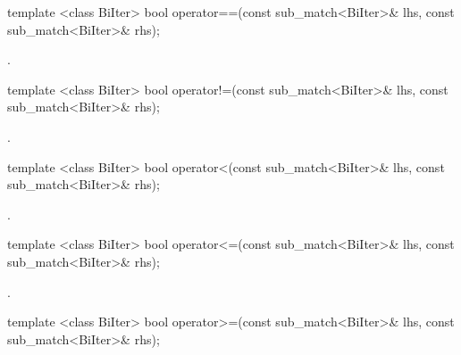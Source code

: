 %
%
\begin{itemdecl}
template <class BiIter>
  bool operator==(const sub_match<BiIter>& lhs, const sub_match<BiIter>& rhs); 
\end{itemdecl}

\begin{itemdescr}
\pnum\returns  {}.
\end{itemdescr}

%
%
\begin{itemdecl}
template <class BiIter>
  bool operator!=(const sub_match<BiIter>& lhs, const sub_match<BiIter>& rhs); 
\end{itemdecl}

\begin{itemdescr}
\pnum\returns {}.
\end{itemdescr}

%
%
\begin{itemdecl}
template <class BiIter>
  bool operator<(const sub_match<BiIter>& lhs, const sub_match<BiIter>& rhs); 
\end{itemdecl}

\begin{itemdescr}
\pnum\returns  {}.
\end{itemdescr}

%
%
\begin{itemdecl}
template <class BiIter>
  bool operator<=(const sub_match<BiIter>& lhs, const sub_match<BiIter>& rhs); 
\end{itemdecl}

\begin{itemdescr}
\pnum\returns  {}.
\end{itemdescr}

%
%
\begin{itemdecl}
template <class BiIter>
  bool operator>=(const sub_match<BiIter>& lhs, const sub_match<BiIter>& rhs); 
\end{itemdecl}

